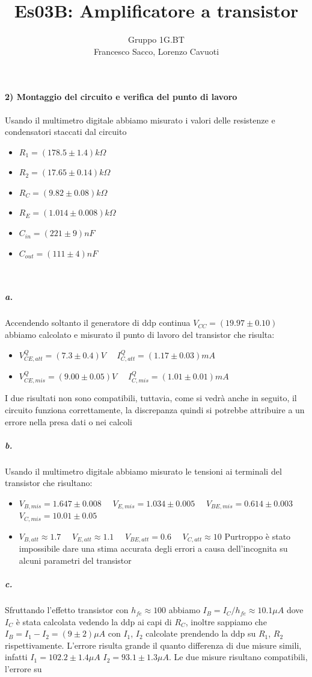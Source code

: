 \documentclass[10pt,a4paper]{article}
\author{Gruppo 1G.BT \\ Francesco Sacco, Lorenzo Cavuoti}
\title{Es03B: Amplificatore a transistor}
\begin{document}
\maketitle
\paragraph{2) Montaggio del circuito e verifica del punto di lavoro}
\newline
Usando il multimetro digitale abbiamo misurato i valori delle resistenze e condensatori staccati dal circuito
\begin{itemize}
\item $R_1=(178.5\pm1.4)k\Omega$ 
\item $R_2=(17.65\pm0.14)k\Omega$ 
\item $R_C=(9.82\pm0.08)k\Omega$ 
\item $R_E=(1.014\pm0.008)k\Omega$
\item $C_{in}=(221\pm9)nF$
\item $C_{out}=(111\pm4)nF$
\end{itemize}
\\
\subparagraph{a.}
Accendendo soltanto il generatore di ddp continua $V_{CC}=(19.97\pm0.10)$ abbiamo calcolato e misurato il punto di lavoro del transistor che risulta:
\begin{itemize}
\item $V_{CE,att}^Q = (7.3\pm0.4)V \quad$ $I_{C,att}^Q = (1.17\pm0.03)mA \quad$
\item $V_{CE,mis}^Q = (9.00\pm0.05)V \quad$ $ I_{C,mis}^Q = (1.01\pm0.01)mA \quad$
\end{itemize}
I due risultati non sono compatibili, tuttavia, come si vedrà anche in seguito, il circuito funziona correttamente, la discrepanza quindi si potrebbe attribuire a un errore nella presa dati o nei calcoli

\subparagraph{b.}
Usando il multimetro digitale abbiamo misurato le tensioni ai terminali del transistor che risultano:
\begin{itemize}
\item $V_{B,mis} = 1.647\pm0.008 \quad$ $V_{E,mis} = 1.034\pm 0.005 \quad$ $V_{BE,mis} = 0.614\pm0.003 \quad$ $V_{C,mis} = 10.01\pm0.05$
\item $V_{B,att} \approx 1.7 \quad$ $V_{E,att} \approx 1.1 \quad$ $V_{BE,att} = 0.6 \quad$ $V_{C,att} \approx 10$\newline
Purtroppo è stato impossibile dare una stima accurata degli errori a causa dell'incognita su alcuni parametri del transistor
\end{itemize}
\subparagraph{c.}
Sfruttando l'effetto transistor con $h_{fe}\approx 100$ abbiamo $I_B = I_C/h_{fe} \approx 10.1 \mu A$ dove $I_C$ è stata calcolata vedendo la ddp ai capi di $R_C$, inoltre sappiamo che $I_B = I_1-I_2 = (9\pm2)\mu A$ con $I_1$, $I_2$ calcolate prendendo la ddp su $R_1$, $R_2$ rispettivamente. L'errore risulta grande il quanto differenza di due misure simili, infatti $I_1=102.2\pm1.4\mu A$ $I_2=93.1\pm1.3\mu A$. Le due misure risultano compatibili, l'errore su 
	
\end{document}
